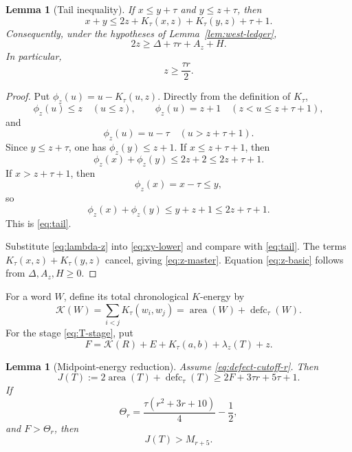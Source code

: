 \documentclass[11pt]{article}
\newtheorem{lemma}[theorem]{Lemma}
\theoremstyle{definition}
\theoremstyle{remark}
\newcommand{\area}{\operatorname{area}}
\newcommand{\defc}{\operatorname{defc}}
\newcommand{\kap}{\mathcal K}
\begin{document}
\begin{lemma}[Tail inequality]
\label{lem:tail}
If $x\le y+\tau$ and $y\le z+\tau$, then
\begin{equation}
 x+y\le
 2z+K_\tau(x,z)+K_\tau(y,z)+\tau+1.
 \label{eq:tail}
\end{equation}
Consequently, under the hypotheses of Lemma~\ref{lem:west-ledger},
\begin{equation}
 2z\ge\Delta+\tau r+A_z+H.
 \label{eq:z-master}
\end{equation}
In particular,
\begin{equation}
 z\ge\frac{\tau r}{2}.
 \label{eq:z-basic}
\end{equation}
\end{lemma}

\begin{proof}
Put $\phi_z(u)=u-K_\tau(u,z)$.  Directly from the definition of
$K_\tau$,
\[
 \phi_z(u)\le z\quad(u\le z),
 \qquad
 \phi_z(u)=z+1\quad(z<u\le z+\tau+1),
\]
and
\[
 \phi_z(u)=u-\tau\quad(u>z+\tau+1).
\]
Since $y\le z+\tau$, one has $\phi_z(y)\le z+1$.  If
$x\le z+\tau+1$, then
\[
 \phi_z(x)+\phi_z(y)\le2z+2\le2z+\tau+1.
\]
If $x>z+\tau+1$, then
\[
 \phi_z(x)=x-\tau\le y,
\]
so
\[
 \phi_z(x)+\phi_z(y)\le y+z+1\le2z+\tau+1.
\]
This is \eqref{eq:tail}.

Substitute \eqref{eq:lambda-z} into \eqref{eq:xy-lower} and compare with
\eqref{eq:tail}.  The terms $K_\tau(x,z)+K_\tau(y,z)$ cancel, giving
\eqref{eq:z-master}.  Equation \eqref{eq:z-basic} follows from
$\Delta,A_z,H\ge0$.
\end{proof}

For a word $W$, define its total chronological $K$-energy by
\begin{equation}
 \kap(W)=\sum_{i<j}K_\tau(w_i,w_j)
 =\area(W)+\defc_\tau(W).
 \label{eq:K-energy}
\end{equation}
For the stage \eqref{eq:T-stage}, put
\begin{equation}
 F=\kap(R)+E+K_\tau(a,b)+\lambda_z(T)+z.
 \label{eq:F}
\end{equation}

\begin{lemma}[Midpoint-energy reduction]
\label{lem:energy-reduction}
Assume \eqref{eq:defect-cutoff-r}.  Then
\begin{equation}
 J(T):=2\area(T)+\defc_\tau(T)
 \ge2F+3\tau r+5\tau+1.
 \label{eq:J-lower}
\end{equation}
If
\begin{equation}
 \Theta_r=\frac{\tau(r^2+3r+10)}4-\frac12,
 \label{eq:Theta}
\end{equation}
and $F>\Theta_r$, then
\begin{equation}
 J(T)>M_{r+5}.
 \label{eq:J-above}
\end{equation}
\end{lemma}
\end{document}
